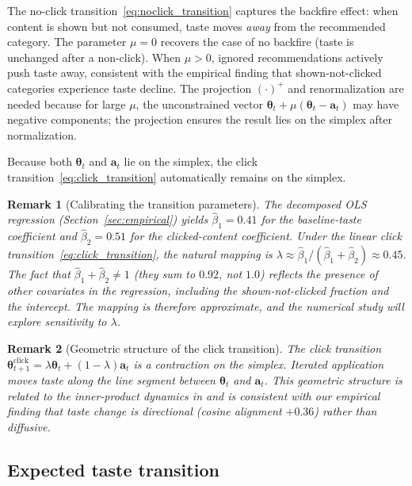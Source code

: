 \documentclass[11pt]{article}
\newtheorem{remark}{Remark}
\begin{document}
The no-click transition~\eqref{eq:noclick_transition} captures the backfire effect: when content is shown but not consumed, taste moves \emph{away} from the recommended category. The parameter $\mu = 0$ recovers the case of no backfire (taste is unchanged after a non-click). When $\mu > 0$, ignored recommendations actively push taste away, consistent with the empirical finding that shown-not-clicked categories experience taste decline. The projection $(\cdot)^{+}$ and renormalization are needed because for large $\mu$, the unconstrained vector $\boldsymbol{\theta}_t + \mu(\boldsymbol{\theta}_t - \mathbf{a}_t)$ may have negative components; the projection ensures the result lies on the simplex after normalization.

Because both $\boldsymbol{\theta}_t$ and $\mathbf{a}_t$ lie on the simplex, the click transition~\eqref{eq:click_transition} automatically remains on the simplex.

\begin{remark}[Calibrating the transition parameters]\label{rem:calibration}
The decomposed OLS regression (Section~\ref{sec:empirical}) yields $\hat{\beta}_1 = 0.41$ for the baseline-taste coefficient and $\hat{\beta}_2 = 0.51$ for the clicked-content coefficient. Under the linear click transition~\eqref{eq:click_transition}, the natural mapping is $\lambda \approx \hat{\beta}_1 / (\hat{\beta}_1 + \hat{\beta}_2) \approx 0.45$. The fact that $\hat{\beta}_1 + \hat{\beta}_2 \ne 1$ (they sum to $0.92$, not $1.0$) reflects the presence of other covariates in the regression, including the shown-not-clicked fraction and the intercept. The mapping is therefore approximate, and the numerical study will explore sensitivity to $\lambda$.
\end{remark}

\begin{remark}[Geometric structure of the click transition]
The click transition $\boldsymbol{\theta}_{t+1}^{\text{click}} = \lambda \boldsymbol{\theta}_t + (1 - \lambda) \mathbf{a}_t$ is a contraction on the simplex. Iterated application moves taste along the line segment between $\boldsymbol{\theta}_t$ and $\mathbf{a}_t$. This geometric structure is related to the inner-product dynamics in \citet{hkazla2019geometric} and is consistent with our empirical finding that taste change is directional (cosine alignment $+0.36$) rather than diffusive.
\end{remark}

\subsection{Expected taste transition}
\end{document}

